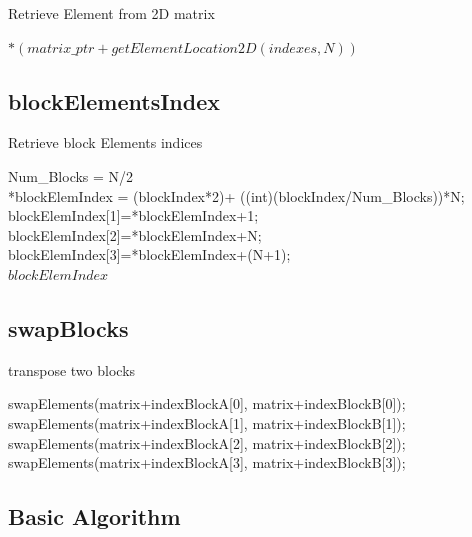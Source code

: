 \documentclass[10pt, onecolumn]{article}
\begin{document}
    \begin{algorithm}[H]
        \label{Alg:retrieveElement2D}
        \caption{Retrieve Element from 2D matrix}
        \Return $*(matrix\_ptr + getElementLocation2D(indexes, N))$
    \end{algorithm}
%
\subsection{blockElementsIndex}

    \begin{algorithm}[H]
        \label{Alg:blockElementsIndex}
        \caption{Retrieve block Elements indices}
        Num\_Blocks = N/2\\
        *blockElemIndex =  (blockIndex*2)+ ((int)(blockIndex/Num\_Blocks))*N;\\
	    blockElemIndex[1]=*blockElemIndex+1; \\
	    blockElemIndex[2]=*blockElemIndex+N;\\
	    blockElemIndex[3]=*blockElemIndex+(N+1);\\
        \Return $blockElemIndex$
    \end{algorithm}
%
\subsection{swapBlocks}

    \begin{algorithm}[H]
        \label{Alg:swapBlocks}
        \caption{transpose two blocks}
        swapElements(matrix+indexBlockA[0], matrix+indexBlockB[0]);\\
	swapElements(matrix+indexBlockA[1], matrix+indexBlockB[1]);\\
	swapElements(matrix+indexBlockA[2], matrix+indexBlockB[2]);\\
	swapElements(matrix+indexBlockA[3], matrix+indexBlockB[3]);\\
    \end{algorithm}
%
\subsection{Basic Algorithm}
\end{document}
